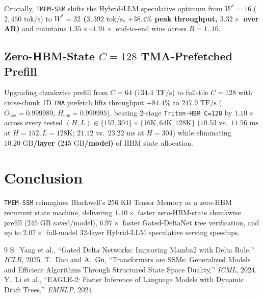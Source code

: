 \documentclass[conference,10pt]{IEEEtran}
\begin{document}
Crucially, \texttt{TMEM-SSM} shifts the Hybrid-LLM speculative optimum from $W^*{=}16$ ($2{,}450\text{ tok/s}$) to \textbf{$W^*{=}32$ ($3{,}392\text{ tok/s}$, $+38.4\%$ peak throughput, $3.32\times$ over AR)} and maintains $1.35\times$--$1.91\times$ end-to-end wins across $B{=}1..16$.

\subsection{Zero-HBM-State $C{=}128$ TMA-Prefetched Prefill}
Upgrading chunkwise prefill from $C{=}64$ ($134.4\text{ TF/s}$) to full-tile $C{=}128$ with cross-chunk 1D \texttt{TMA} prefetch lifts throughput $+84.4\%$ to \textbf{$247.9\text{ TF/s}$} ($O_{\cos}{=}0.999989$, $H_{\cos}{=}0.999995$), beating 2-stage \texttt{Triton-HBM C=128} by \textbf{$1.10\times$} across every tested $(H, L) \in \{152, 304\} \times \{16\text{K}, 64\text{K}, 128\text{K}\}$ ($10.53$ vs.\ $11.56\text{ ms}$ at $H{=}152, L{=}128\text{K}$; $21.12$ vs.\ $23.22\text{ ms}$ at $H{=}304$) while eliminating \textbf{$10.20\text{ GB}$/layer ($245\text{ GB}$/model)} of HBM state allocation.

\section{Conclusion}
\texttt{TMEM-SSM} reimagines Blackwell's $256\text{ KB}$ Tensor Memory as a zero-HBM recurrent state machine, delivering $1.10\times$ faster zero-HBM-state chunkwise prefill ($245\text{ GB}$ saved/model), $6.97\times$ faster Gated-DeltaNet tree verification, and up to $2.07\times$ full-model 32-layer Hybrid-LLM speculative serving speedups.

\begin{thebibliography}{9}
 S.~Yang et al., ``Gated Delta Networks: Improving Mamba2 with Delta Rule,'' \emph{ICLR}, 2025.
 T.~Dao and A.~Gu, ``Transformers are SSMs: Generalized Models and Efficient Algorithms Through Structured State Space Duality,'' \emph{ICML}, 2024.
 Y.~Li et al., ``EAGLE-2: Faster Inference of Language Models with Dynamic Draft Trees,'' \emph{EMNLP}, 2024.
\end{thebibliography}
\end{document}
